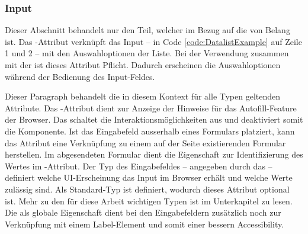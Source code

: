 \subsubsection{\color{dgray} Input}
\label{sec:input}

Dieser Abschnitt behandelt nur den Teil, welcher im Bezug auf die  von Belang ist.
Das -Attribut verknüpft das Input – in Code \ref{code:DatalistExample} auf Zeile 1 und 2 – mit den Auswahloptionen der Liste.
Bei der Verwendung zusammen mit der  ist dieses Attribut Pflicht.
Dadurch erscheinen die Auswahloptionen während der Bedienung des Input-Feldes. 

Dieser Paragraph behandelt die in diesem Kontext für alle Typen geltenden Attribute.
Das -Attribut dient zur Anzeige der Hinweise für das Autofill-Feature der Browser.
Das  schaltet die Interaktionsmöglichkeiten aus und deaktiviert somit die Komponente.
Ist das Eingabefeld ausserhalb eines Formulars platziert, kann das Attribut  eine Verknüpfung zu einem auf der Seite existierenden Formular herstellen.
Im abgesendeten Formular dient die Eigenschaft  zur Identifizierung des Wertes im -Attribut.
Der Typ des Eingabefeldes – angegeben durch das  – definiert welche UI-Erscheinung das Input im Browser erhält und welche Werte zulässig sind.
Als Standard-Typ ist  definiert, wodurch dieses Attribut optional ist.
Mehr zu den für diese Arbeit wichtigen Typen ist im Unterkapitel \textbf{} zu lesen.
Die  als globale Eigenschaft dient bei den Eingabefeldern zusätzlich noch zur Verknüpfung mit einem Label-Element und somit einer bessern Accessibility.

